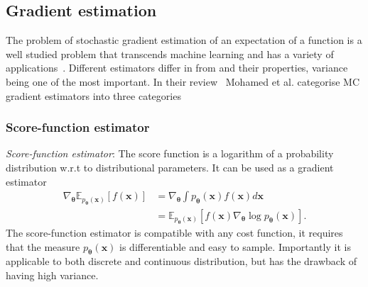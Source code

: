 \subsection{Gradient estimation}
\label{subsec:gbopt-gest}
The problem of stochastic gradient estimation of an expectation of a function is a well studied problem that transcends machine learning and has a variety of applications~\cite{chriss1997black, schrittwieser2020mastering}. Different estimators differ in from and their properties, variance being one of the most important. In their review~\cite{mohamed2020monte} Mohamed et al. categorise MC gradient estimators into three categories

\subsubsection{Score-function estimator}
\emph{Score-function estimator}: The score function is a logarithm of a probability distribution w.r.t to distributional parameters. It can be used as a gradient estimator
\begin{equation}
\begin{aligned}
\nabla_{\boldsymbol{\theta}} \mathbb{E}_{p_{\boldsymbol{\theta}}(\mathbf{x})}[f(\mathbf{x})] &=  \nabla_{\boldsymbol{\theta}} \int p_{\boldsymbol{\theta}}(\mathbf{x}) f(\mathbf{x}) d \mathbf{x} \\
&= \mathbb{E}_{p_{\boldsymbol{\theta}}(\mathbf{x})}\left[f(\mathbf{x}) \nabla_{\boldsymbol{\theta}} \log p_{\boldsymbol{\theta}}(\mathbf{x})\right].
\end{aligned}
\end{equation}
The score-function estimator is compatible with any cost function, it requires that the measure $p_{\boldsymbol{\theta}}(\mathbf{x})$ is differentiable and easy to sample. Importantly it is applicable to both discrete and continuous distribution, but has the drawback of having high variance.

